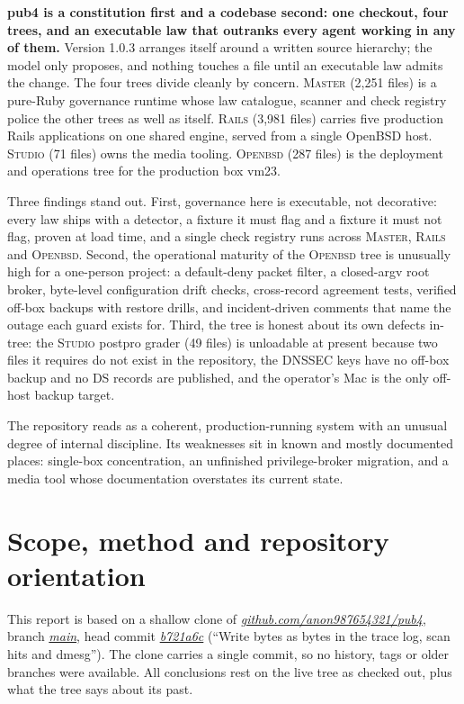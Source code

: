 \documentclass[oneside]{article}
\newcommand{\treename}[1]{\mbox{\textsc{#1}}}
\newcommand{\mtree}{\treename{Master}}
\newcommand{\rtree}{\treename{Rails}}
\newcommand{\stree}{\treename{Studio}}
\newcommand{\otree}{\treename{Openbsd}}
\newcommand{\fpath}[1]{\emph{\url{#1}}}
\begin{document}
\textbf{pub4 is a constitution first and a codebase second: one checkout, four trees, and an executable law that outranks every agent working in any of them.} Version 1.0.3 arranges itself around a written source hierarchy; the model only proposes, and nothing touches a file until an executable law admits the change. The four trees divide cleanly by concern. \mtree{} (2,251 files) is a pure-Ruby governance runtime whose law catalogue, scanner and check registry police the other trees as well as itself. \rtree{} (3,981 files) carries five production Rails applications on one shared engine, served from a single OpenBSD host. \stree{} (71 files) owns the media tooling. \otree{} (287 files) is the deployment and operations tree for the production box vm23.

Three findings stand out. First, governance here is executable, not decorative: every law ships with a detector, a fixture it must flag and a fixture it must not flag, proven at load time, and a single check registry runs across \mtree, \rtree{} and \otree. Second, the operational maturity of the \otree{} tree is unusually high for a one-person project: a default-deny packet filter, a closed-argv root broker, byte-level configuration drift checks, cross-record agreement tests, verified off-box backups with restore drills, and incident-driven comments that name the outage each guard exists for. Third, the tree is honest about its own defects in-tree: the \stree{} postpro grader (49 files) is unloadable at present because two files it requires do not exist in the repository, the DNSSEC keys have no off-box backup and no DS records are published, and the operator's Mac is the only off-host backup target.

The repository reads as a coherent, production-running system with an unusual degree of internal discipline. Its weaknesses sit in known and mostly documented places: single-box concentration, an unfinished privilege-broker migration, and a media tool whose documentation overstates its current state.

\section{Scope, method and repository orientation}

This report is based on a shallow clone of \fpath{github.com/anon987654321/pub4}, branch \fpath{main}, head commit \fpath{b721a6c} (``Write bytes as bytes in the trace log, scan hits and dmesg''). The clone carries a single commit, so no history, tags or older branches were available. All conclusions rest on the live tree as checked out, plus what the tree says about its past.
\end{document}
